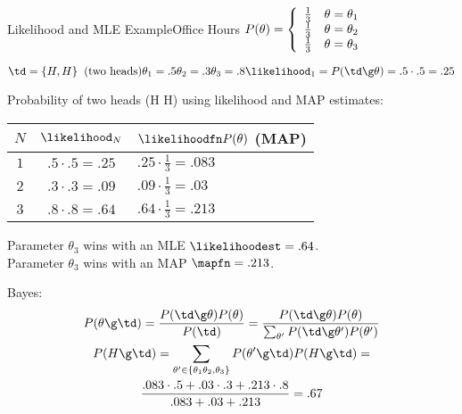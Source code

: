 \documentclass[12pt]{article}
\begin{document}
\begin{ddexample}{Likelihood and MLE Example}{Office Hours}
\noindent
\begin{math}
P(\theta) = \left\{
\begin{array}{l l}
\frac{1}{3} & \theta = \theta_1\\
\frac{1}{3} & \theta = \theta_2\\
\frac{1}{3} & \theta = \theta_3
\end{array} \right.\\
\end{math}

\noindent
\begin{math}
\td = \{ H, H \} \;\; \text{(two heads)}\\
\theta_1 = .5\\
\theta_2 = .3\\
\theta_3 = .8\\
\likelihood_1 = P(\td \g \theta) = .5 \cdot .5 = .25
\end{math}

\vspace{.2cm}

\noindent
Probability of two heads (H H) using likelihood and MAP estimates:\\
\begin{tabular}{c|c|l}
$N$ & $\likelihood_N$ & $\likelihoodfn P(\theta)$ (MAP)\\
\hline
$1$ & $.5 \cdot .5 = .25$ & $.25 \cdot \frac{1}{3} = .083$\\
$2$ & $.3 \cdot .3 = .09$ & $.09 \cdot \frac{1}{3} = .03$\\
$3$ & $.8 \cdot .8 = .64$ & $.64 \cdot \frac{1}{3} = .213$\\
\end{tabular}

\vspace{.2cm}
\noindent
Parameter $\theta_3$ wins with an MLE $\likelihoodest = .64$.\\
Parameter $\theta_3$ wins with an MAP $\mapfn = .213$.

\vspace{.2cm}

\noindent
Bayes:\\
\begin{displaymath}
\begin{gathered}
P(\theta \g \td) = \frac{P(\td \g \theta)P(\theta)}{P(\td)}=
\frac{P(\td \g \theta)P(\theta)}{\sum_{\theta'}P(\td \g \theta')P(\theta')}\\
P(H \g \td) = \sum_{\theta'\in \{\theta_1 \theta_2, \theta_3\}}P(\theta' \g \td)P(H \g \td)=\\
\frac
{.083 \cdot .5 + .03 \cdot .3 + .213 \cdot .8}
{.083 + .03 + .213}=.67
\end{gathered}
\end{displaymath}

\end{ddexample}
\end{document}
